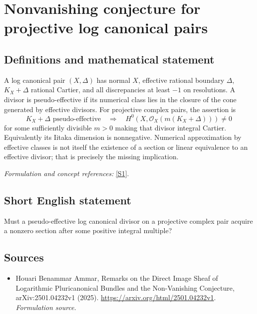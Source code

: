 \documentclass[11pt]{article}
\begin{document}
\section*{\texorpdfstring{Nonvanishing conjecture for projective log canonical pairs}{Nonvanishing conjecture for projective log canonical pairs}}\label{194}
\subsection{Definitions and mathematical statement}
A log canonical pair $(X,\Delta)$ has normal $X$, effective rational boundary $\Delta$, $K_X+\Delta$ rational Cartier, and all discrepancies at least $-1$ on resolutions. A divisor is pseudo-effective if its numerical class lies in the closure of the cone generated by effective divisors. For projective complex pairs, the assertion is
\[
 K_X+\Delta\text{ pseudo-effective}
 \quad\Longrightarrow\quad
 H^0(X,\mathcal O_X(m(K_X+\Delta)))\ne0
\]
for some sufficiently divisible $m>0$ making that divisor integral Cartier. Equivalently its Iitaka dimension is nonnegative. Numerical approximation by effective classes is not itself the existence of a section or linear equivalence to an effective divisor; that is precisely the missing implication.
\par\smallskip\textit{Formulation and concept references:} \href{https://arxiv.org/html/2501.04232v1}{[S1]}.

\subsection{Short English statement}
Must a pseudo-effective log canonical divisor on a projective complex pair acquire a nonzero section after some positive integral multiple?
\subsection{Sources}
\begin{itemize}
\item[S1]Houari Benammar Ammar, Remarks on the Direct Image Sheaf of Logarithmic Pluricanonical Bundles and the Non-Vanishing Conjecture, arXiv:2501.04232v1 (2025).
\url{https://arxiv.org/html/2501.04232v1}.
\textit{Formulation source.}
\end{itemize}
\end{document}
